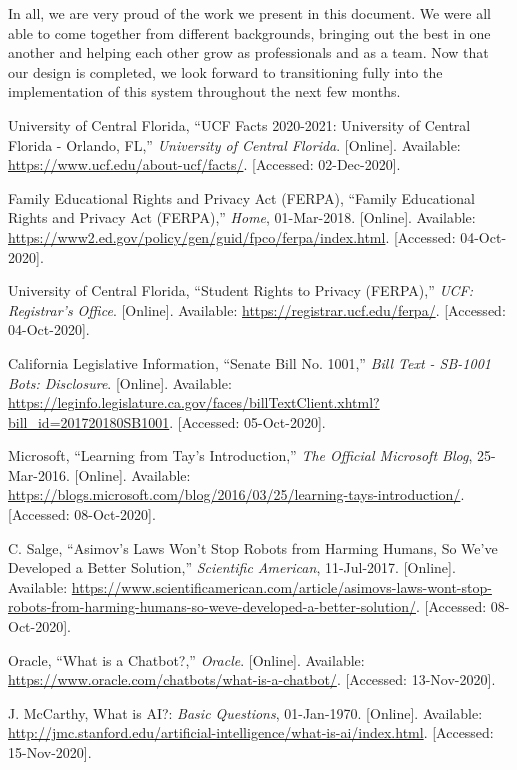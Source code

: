 \documentclass[titlepage, 12pt]{article}
\begin{document}
In all, we are very proud of the work we present in this document. We were all able to come together from different backgrounds, bringing out the best in one another and helping each other grow as professionals and as a team. Now that our design is completed, we look forward to transitioning fully into the implementation of this system throughout the next few months.

\pagebreak


\begin{thebibliography}{9}

University of Central Florida, “UCF Facts 2020-2021: University of Central Florida - Orlando, FL,” \emph{University of Central Florida}. [Online]. Available: \url{https://www.ucf.edu/about-ucf/facts/}. [Accessed: 02-Dec-2020].

Family Educational Rights and Privacy Act (FERPA), “Family Educational Rights and Privacy Act (FERPA),” \emph{Home}, 01-Mar-2018. [Online]. Available: \url{https://www2.ed.gov/policy/gen/guid/fpco/ferpa/index.html}. [Accessed: 04-Oct-2020].

University of Central Florida, “Student Rights to Privacy (FERPA),” \emph{UCF: Registrar's Office}. [Online]. Available: \url{https://registrar.ucf.edu/ferpa/}. [Accessed: 04-Oct-2020].

California Legislative Information, “Senate Bill No. 1001,” \emph{Bill Text - SB-1001 Bots: Disclosure}. [Online]. Available: \url{https://leginfo.legislature.ca.gov/faces/billTextClient.xhtml?bill\_id=201720180SB1001}. [Accessed: 05-Oct-2020].

Microsoft, “Learning from Tay's Introduction,” \emph{The Official Microsoft Blog}, 25-Mar-2016. [Online]. Available: \url{https://blogs.microsoft.com/blog/2016/03/25/learning-tays-introduction/}. [Accessed: 08-Oct-2020].

C. Salge, “Asimov's Laws Won't Stop Robots from Harming Humans, So We've Developed a Better Solution,” \emph{Scientific American}, 11-Jul-2017. [Online]. Available: \url{https://www.scientificamerican.com/article/asimovs-laws-wont-stop-robots-from-harming-humans-so-weve-developed-a-better-solution/}. [Accessed: 08-Oct-2020].

Oracle, “What is a Chatbot?,” \emph{Oracle}. [Online]. Available: \url{https://www.oracle.com/chatbots/what-is-a-chatbot/}. [Accessed: 13-Nov-2020].

J. McCarthy, What is AI?: \emph{Basic Questions}, 01-Jan-1970. [Online]. Available: \url{http://jmc.stanford.edu/artificial-intelligence/what-is-ai/index.html}. [Accessed: 15-Nov-2020].


\end{thebibliography}
\end{document}
